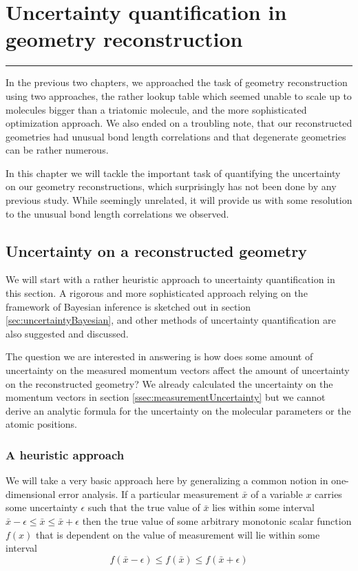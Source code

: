 \chapter{Uncertainty quantification in geometry reconstruction} \label{ch:uncertainty}

\vspace{-1.5 em}
\begin{addmargin}[-0.5cm]{0cm}
  \minitoc
\end{addmargin}
\hrule
\vspace{1.5 em}

In the previous two chapters, we approached the task of geometry reconstruction using two approaches, the rather lookup table which seemed unable to scale up to molecules bigger than a triatomic molecule, and the more sophisticated optimization approach. We also ended on a troubling note, that our reconstructed geometries had unusual bond length correlations and that degenerate geometries can be rather numerous.

In this chapter we will tackle the important task of quantifying the uncertainty on our geometry reconstructions, which surprisingly has not been done by any previous study. While seemingly unrelated, it will provide us with some resolution to the unusual bond length correlations we observed.

\section{Uncertainty on a reconstructed geometry}
We will start with a rather heuristic approach to uncertainty quantification in this section. A rigorous and more sophisticated approach relying on the framework of Bayesian inference is sketched out in section \ref{sec:uncertaintyBayesian}, and other methods of uncertainty quantification are also suggested and discussed.

The question we are interested in answering is how does some amount of uncertainty on the measured momentum vectors affect the amount of uncertainty on the reconstructed geometry? We already calculated the uncertainty on the momentum vectors in section \ref{ssec:measurementUncertainty} but we cannot derive an analytic formula for the uncertainty on the molecular parameters or the atomic positions.

\subsection{A heuristic approach}
We will take a very basic approach here by generalizing a common notion in one-dimensional error analysis. If a particular measurement $\bar{x}$ of a variable $x$ carries some uncertainty $\epsilon$ such that the true value of $\bar{x}$ lies within some interval $\bar{x} - \epsilon \le \bar{x} \le \bar{x} + \epsilon$ then the true value of some arbitrary monotonic scalar function $f(x)$ that is dependent on the value of measurement will lie within some interval
\begin{equation}
  f(\bar{x} - \epsilon) \le f(\bar{x}) \le f(\bar{x} + \epsilon)
\end{equation}

